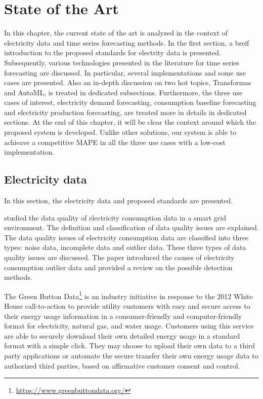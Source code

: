\chapter{State of the Art}
\label{cha:soa}
\vspace{0.4 cm}

In this chapter, the current state of the art is analyzed in the context of electricity data and time series forecasting methods.
In the first section, a breif introduction to the proposed standards for electrity data is presented.
Subsequently, various technologies presented in the literature for time series forecasting are discussed.
In particular, several implementations and some use cases are presented.
Also an in-depth discussion on two hot topics, Transformas and AutoML, is treated in dedicated subsections.
Furthermore, the three use cases of interest, electricity demand forecasting, consumption baseline forecasting and electricity production forecasting, are treated more in details in dedicated sections.
At the end of this chapter, it will be clear the context around which the proposed system is developed.
Unlike other solutions, our system is able to achieave a competitive MAPE in all the three use cases with a low-cost implementation.


\section{Electricity data}
\label{sec:data}
\vspace{0.2 cm}

In this section, the electricity data and proposed standards are presented.

\cite{CHEN201798} studied the data quality of electricity consumption data in a smart grid environment.
The definition and classification of data quality issues are explained.
The data quality issues of electricity consumption data are classified into three types: noise data, incomplete data and outlier data.
These three types of data quality issues are discussed.
The paper introduced the causes of electricity consumption outlier data and provided a review on the possible detection methods.

The Green Button Data\footnote{ \url{https://www.greenbuttondata.org/} } is an industry initiative in response to the 2012 White House call-to-action to provide utility customers with easy and secure access to their energy usage information in a consumer-friendly and computer-friendly format for electricity, natural gas, and water usage.
Customers using this service are able to securely download their own detailed energy usage in a standard format with a simple click.
They may choose to upload their own data to a third party applications or automate the secure transfer their own energy usage data to authorized third parties, based on affirmative customer consent and control.

